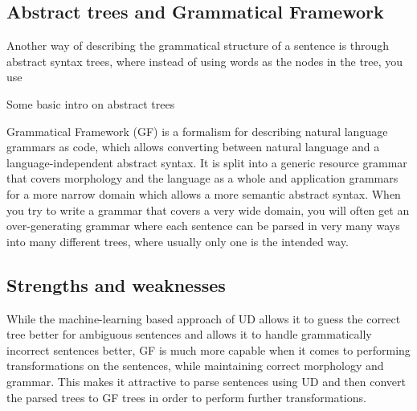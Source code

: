 \documentclass{article}
\begin{document}





\subsection{Abstract trees and Grammatical Framework}

Another way of describing the grammatical structure of a sentence is through abstract syntax trees, where instead of using words as the nodes in the tree, you use

Some basic intro on abstract trees
 

Grammatical Framework\cite{ranta-2004} (GF) is a formalism for describing natural language grammars as code, which allows converting between natural language and a language-independent abstract syntax. It is split into a generic resource grammar that covers morphology and the language as a whole and application grammars for a more narrow domain which allows a more semantic abstract syntax. When you try to write a grammar that covers a very wide domain, you will often get an over-generating grammar where each sentence can be parsed in very many ways into many different trees, where usually only one is the intended way.

\subsection{Strengths and weaknesses}

While the machine-learning based approach of UD allows it to guess the correct tree better for ambiguous sentences and allows it to handle grammatically incorrect sentences better, GF is much more capable when
it comes to performing transformations on the sentences, while maintaining correct morphology and grammar. This makes it attractive to parse sentences
using UD and then convert the parsed trees to GF trees in order to perform further transformations.
\end{document}
